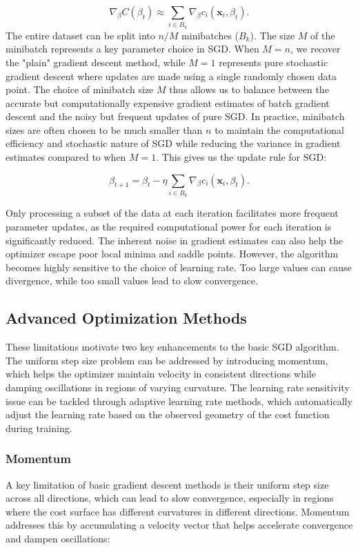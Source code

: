 \begin{equation}
    \nabla_\beta C(\beta_t) \approx \sum_{i \in B_k}\nabla_\beta c_i(\mathbf{x}_i, \beta_t).
\end{equation}
The entire dataset can be split into \( n/M \) minibatches (\( B_k \)). The size \( M \) of the minibatch represents a key parameter choice in SGD. When \( M = n \), we recover the "plain" gradient descent method, while \( M = 1 \) represents pure stochastic gradient descent where updates are made using a single randomly chosen data point. The choice of minibatch size \( M \) thus allows us to balance between the accurate but computationally expensive gradient estimates of batch gradient descent and the noisy but frequent updates of pure SGD. In practice, minibatch sizes are often chosen to be much smaller than \( n \) to maintain the computational efficiency and stochastic nature of SGD while reducing the variance in gradient estimates compared to when \( M = 1 \). This gives us the update rule for SGD:

\begin{equation}
    \beta_{t+1} = \beta_t - \eta \sum_{i \in B_k} \nabla_\beta c_i(\mathbf{x}_i, \beta_t).
\end{equation}

Only processing a subset of the data at each iteration facilitates more frequent parameter updates, as the required computational power for each iteration is significantly reduced. The inherent noise in gradient estimates can also help the optimizer escape poor local minima and saddle points. However, the algorithm becomes highly sensitive to the choice of learning rate. Too large values can cause divergence, while too small values lead to slow convergence.

\subsection{Advanced Optimization Methods}

These limitations motivate two key enhancements to the basic SGD algorithm. The uniform step size problem can be addressed by introducing momentum, which helps the optimizer maintain velocity in consistent directions while damping oscillations in regions of varying curvature. The learning rate sensitivity issue can be tackled through adaptive learning rate methods, which automatically adjust the learning rate based on the observed geometry of the cost function during training.

\subsubsection{Momentum}
A key limitation of basic gradient descent methods is their uniform step size across all directions, which can lead to slow convergence, especially in regions where the cost surface has different curvatures in different directions. Momentum addresses this by accumulating a velocity vector that helps accelerate convergence and dampen oscillations:

